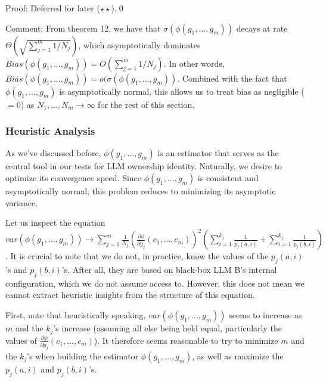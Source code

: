 \documentclass{article}
\begin{document}
Proof: Deferred for later ($\displaystyle \star \star $).\qed 



Comment: From theorem 12, we have that $\sigma( \phi ( g_{1} ,...,g_{m}))$ decays at rate $\Theta (\sqrt{\sum _{j=1}^{m} 1/N_{j}})$, which asymptotically dominates $Bias( \phi ( g_{1} ,...,g_{m})) =O(\sum _{j=1}^{m} 1/N_{j})$. In other words, $Bias( \phi ( g_{1} ,...,g_{m})) =o( \sigma ( \phi ( g_{1} ,...,g_{m}))$. Combined with the fact that $\displaystyle \phi ( g_{1} ,...,g_{m})$ is asymptotically normal, this allows us to treat bias as negligible ($\displaystyle =0$) as $\displaystyle N_{1} ,...,N_{m}\rightarrow \infty $ for the rest of this section.



\subsubsection*{Heuristic Analysis}

As we've discussed before, $\displaystyle \phi \left( g_{1} ,...,g_{m}\right)$ is an estimator that serves as the central tool in our tests for LLM ownership identity. Naturally, we desire to optimize its convergence speed. Since $\displaystyle \phi \left( g_{1} ,...,g_{m}\right)$ is consistent and asymptotically normal, this problem reduces to minimizing its asymptotic variance.



Let us inspect the equation $\displaystyle var\left( \phi \left( g_{1} ,...,g_{m}\right)\right)\rightarrow \sum _{j=1}^{m}\frac{1}{N_{j}}\left(\frac{\partial \phi }{\partial g_{j}}\left( c_{1} ,...,c_{m}\right)\right)^{2}\left(\sum _{i=1}^{k_{j}}\frac{1}{p_{j}\left( a,i\right)} +\sum _{i=1}^{k_{j}}\frac{1}{p_{j}\left( b,i\right)}\right)$. It is crucial to note that we do not, in practice, know the values of the $\displaystyle p_{j}\left( a,i\right)$'s and $\displaystyle p_{j}\left( b,i\right)$'s. After all, they are based on black-box LLM B's internal configuration, which we do not assume access to. However, this does not mean we cannot extract heuristic insights from the structure of this equation.



First, note that heuristically speaking, $\displaystyle var\left( \phi \left( g_{1} ,...,g_{m}\right)\right)$ seems to increase as $\displaystyle m$ and the $\displaystyle k_{j}$'s increase (assuming all else being held equal, particularly the values of $\displaystyle \frac{\partial \phi }{\partial g_{j}}\left( c_{1} ,...,c_{m}\right)$). It therefore seems reasonable to try to minimize $\displaystyle m$ and the $\displaystyle k_{j}$'s when building the estimator $\displaystyle \phi \left( g_{1} ,...,g_{m}\right)$, as well as maximize the $\displaystyle p_{j}\left( a,i\right)$ and $\displaystyle p_{j}\left( b,i\right)$'s.
\end{document}
